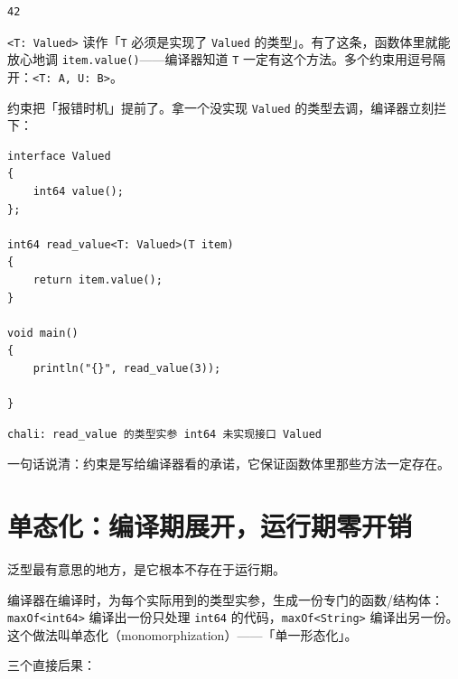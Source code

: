 \par
\medskip
\begin{lstlisting}[style=out]
42
\end{lstlisting}
\par
\medskip

\texttt{<\allowbreak{}T:\allowbreak{} Valued>\allowbreak{}} 读作「\texttt{T} 必须是实现了 \texttt{Valued} 的类型」。有了这条，函数体里就能放心地调 \texttt{item.\allowbreak{}value(\allowbreak{})\allowbreak{}}——编译器知道 \texttt{T} 一定有这个方法。多个约束用逗号隔开：\texttt{<\allowbreak{}T:\allowbreak{} A,\allowbreak{} U:\allowbreak{} B>\allowbreak{}}。

约束把「报错时机」提前了。拿一个没实现 \texttt{Valued} 的类型去调，编译器立刻拦下：

\par
\medskip
\begin{lstlisting}[style=chali]
interface Valued
{
    int64 value();
};

int64 read_value<T: Valued>(T item)
{
    return item.value();
}

void main()
{
    println("{}", read_value(3));

}
\end{lstlisting}
\par
\medskip

\par
\medskip
\begin{lstlisting}[style=out]
chali: read_value 的类型实参 int64 未实现接口 Valued
\end{lstlisting}
\par
\medskip

一句话说清：约束是写给编译器看的承诺，它保证函数体里那些方法一定存在。

\section{单态化：编译期展开，运行期零开销}

泛型最有意思的地方，是它根本不存在于运行期。

编译器在编译时，为每个实际用到的类型实参，生成一份专门的函数/结构体：\texttt{max\allowbreak{}Of<\allowbreak{}int64>\allowbreak{}} 编译出一份只处理 \texttt{int64} 的代码，\texttt{max\allowbreak{}Of<\allowbreak{}String>\allowbreak{}} 编译出另一份。这个做法叫单态化（monomorphization）——「单一形态化」。

三个直接后果：

